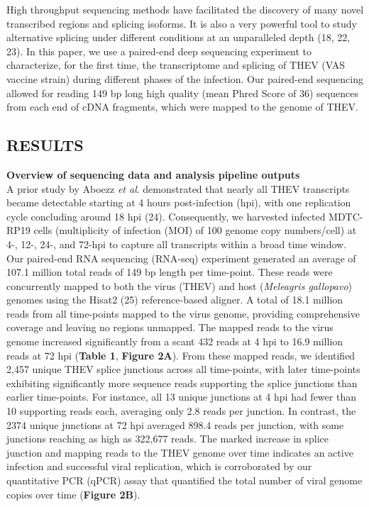 \documentclass[
]{article}
\begin{document}
High throughput sequencing methods have facilitated the discovery of
many novel transcribed regions and splicing isoforms. It is also a very
powerful tool to study alternative splicing under different conditions
at an unparalleled depth (18, 22, 23). In this paper, we use a
paired-end deep sequencing experiment to characterize, for the first
time, the transcriptome and splicing of THEV (VAS vaccine strain) during
different phases of the infection. Our paired-end sequencing allowed for
reading 149 bp long high quality (mean Phred Score of 36) sequences from
each end of cDNA fragments, which were mapped to the genome of THEV.
\newpage

\subsection{RESULTS}\label{results}

\textbf{Overview of sequencing data and analysis pipeline outputs}\\
A prior study by Aboezz \emph{et al}. demonstrated that nearly all THEV
transcripts became detectable starting at 4 hours post-infection (hpi),
with one replication cycle concluding around 18 hpi (24). Consequently,
we harvested infected MDTC-RP19 cells (multiplicity of infection (MOI)
of 100 genome copy numbers/cell) at 4-, 12-, 24-, and 72-hpi to capture
all transcripts within a broad time window. Our paired-end RNA
sequencing (RNA-seq) experiment generated an average of 107.1 million
total reads of 149 bp length per time-point. These reads were
concurrently mapped to both the virus (THEV) and host (\emph{Meleagris
gallopavo}) genomes using the Hisat2 (25) reference-based aligner. A
total of 18.1 million reads from all time-points mapped to the virus
genome, providing comprehensive coverage and leaving no regions
unmapped. The mapped reads to the virus genome increased significantly
from a scant 432 reads at 4 hpi to 16.9 million reads at 72 hpi
(\textbf{Table 1}, \textbf{Figure 2A}). From these mapped reads, we
identified 2,457 unique THEV splice junctions across all time-points,
with later time-points exhibiting significantly more sequence reads
supporting the splice junctions than earlier time-points. For instance,
all 13 unique junctions at 4 hpi had fewer than 10 supporting reads
each, averaging only 2.8 reads per junction. In contrast, the 2374
unique junctions at 72 hpi averaged 898.4 reads per junction, with some
junctions reaching as high as 322,677 reads. The marked increase in
splice junction and mapping reads to the THEV genome over time indicates
an active infection and successful viral replication, which is
corroborated by our quantitative PCR (qPCR) assay that quantified the
total number of viral genome copies over time (\textbf{Figure 2B}).
\end{document}
